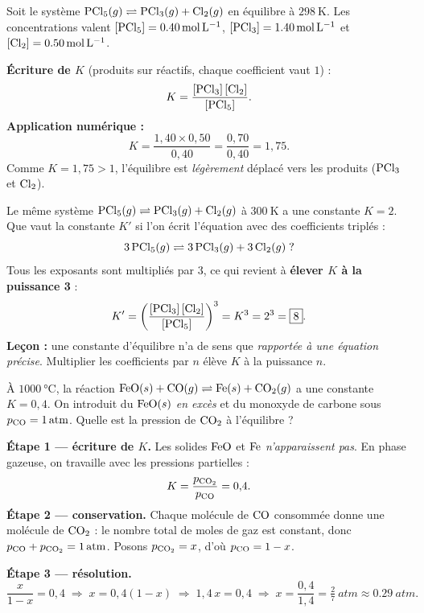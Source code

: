 \documentclass[11pt,a4paper]{article}
\begin{document}
\begin{exemple}
Soit le système \;$\ce{PCl5}(g) \rightleftharpoons \ce{PCl3}(g) + \ce{Cl2}(g)$\; en équilibre à
$\SI{298}{\kelvin}$. Les concentrations valent $[\ce{PCl5}] = \SI{0.40}{\mol\per\litre}$,
$[\ce{PCl3}] = \SI{1.40}{\mol\per\litre}$ et $[\ce{Cl2}] = \SI{0.50}{\mol\per\litre}$.

\textbf{Écriture de $K$} (produits sur réactifs, chaque coefficient vaut $1$) :
\[ K = \frac{[\ce{PCl3}]\,[\ce{Cl2}]}{[\ce{PCl5}]}. \]
\textbf{Application numérique :}
\[ K = \frac{1{,}40 \times 0{,}50}{0{,}40} = \frac{0{,}70}{0{,}40} = \boxed{1{,}75}. \]
Comme $K = 1{,}75 > 1$, l'équilibre est \emph{légèrement} déplacé vers les produits ($\ce{PCl3}$ et
$\ce{Cl2}$).
\end{exemple}

\begin{exemple}
Le même système $\ce{PCl5}(g) \rightleftharpoons \ce{PCl3}(g) + \ce{Cl2}(g)$ à $\SI{300}{\kelvin}$ a une
constante $K = 2$. Que vaut la constante $K'$ si l'on écrit l'équation avec des coefficients triplés :
\[ 3\,\ce{PCl5}(g) \rightleftharpoons 3\,\ce{PCl3}(g) + 3\,\ce{Cl2}(g)\;? \]
Tous les exposants sont multipliés par $3$, ce qui revient à \textbf{élever $K$ à la puissance 3} :
\[ K' = \left(\frac{[\ce{PCl3}]\,[\ce{Cl2}]}{[\ce{PCl5}]}\right)^{3} = K^{3} = 2^{3} = \boxed{8}. \]
\textbf{Leçon :} une constante d'équilibre n'a de sens que \emph{rapportée à une équation précise}.
Multiplier les coefficients par $n$ élève $K$ à la puissance $n$.
\end{exemple}

\begin{exemple}
À $\SI{1000}{\celsius}$, la réaction \;$\ce{FeO}(s) + \ce{CO}(g) \rightleftharpoons \ce{Fe}(s) + \ce{CO2}(g)$\;
a une constante $K = 0{,}4$. On introduit du $\ce{FeO}(s)$ \emph{en excès} et du monoxyde de carbone sous
$p_{\ce{CO}} = \SI{1}{atm}$. Quelle est la pression de $\ce{CO2}$ à l'équilibre ?

\textbf{Étape 1 — écriture de $K$.} Les solides $\ce{FeO}$ et $\ce{Fe}$ \emph{n'apparaissent pas}. En
phase gazeuse, on travaille avec les pressions partielles :
\[ K = \frac{p_{\ce{CO2}}}{p_{\ce{CO}}} = 0{,}4. \]
\textbf{Étape 2 — conservation.} Chaque molécule de $\ce{CO}$ consommée donne une molécule de $\ce{CO2}$ :
le nombre total de moles de gaz est constant, donc $p_{\ce{CO}} + p_{\ce{CO2}} = \SI{1}{atm}$. Posons
$p_{\ce{CO2}} = x$, d'où $p_{\ce{CO}} = 1 - x$.

\textbf{Étape 3 — résolution.}
\[ \frac{x}{1-x} = 0{,}4 \;\Longrightarrow\; x = 0{,}4(1-x) \;\Longrightarrow\; 1{,}4\,x = 0{,}4
   \;\Longrightarrow\; x = \frac{0{,}4}{1{,}4} = \boxed{\tfrac{2}{7}\ \si{atm}} \approx \SI{0.29}{atm}. \]
\end{exemple}
\end{document}
